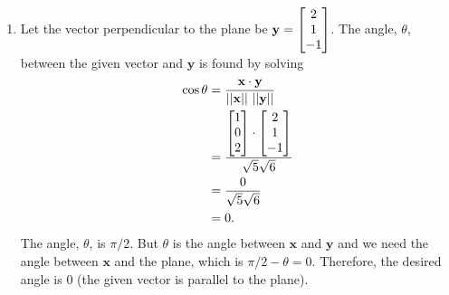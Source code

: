 \documentclass{article}
\begin{document}
\begin{enumerate}
\begin{enumerate}
\item 
Let the vector perpendicular to the plane be $\mathbf{y}= \begin{bmatrix} 2 \\ 1 \\ -1 \end{bmatrix}$. The angle, $\theta$, between the given vector and $\mathbf{y}$ is found by solving
\begin{align*}
  \cos\theta &= \frac{ \mathbf{x}\cdot \mathbf{y}}{|| \mathbf{x}|| \ || \mathbf{y}||} \\
  &= \frac{ \BM 1 \\0 \\ 2 \EM \cdot \BM 2 \\1 \\-1 \EM} {\sqrt{5}\sqrt{6}}\\
    &= \frac{ 0 } {\sqrt{5}\sqrt{6}}\\
    &=0.
\end{align*}
The angle, $\theta$, is $\pi/2$. But $\theta$ is the angle between $\mathbf{x}$ and $\mathbf{y}$ and we need the angle between $\mathbf{x}$ and the plane, which is $\pi/2 - \theta = 0$. Therefore, the desired angle is 0 (the given vector is parallel to the plane). 
\end{enumerate}


\end{enumerate}
\end{document}
